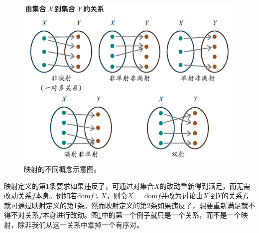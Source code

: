 \documentclass[../main.tex]{subfiles}
\begin{document}
\begin{figure}[htbp]
    \centering
    \includegraphics{../images/mapping.pdf}
    \caption{映射的不同概念示意图。}
    \label{fig:II.1.3}
\end{figure}

映射定义的第1条要求如果违反了，可通过对集合$X$的改动重新得到满足，而无需改动关系$f$本身。例如若$\mathrm{dom}f\subsetneqq X$，则令$X^\prime=\mathrm{dom}f$并改为讨论由$X^\prime$到$Y$的关系$f$，就可通过映射定义的第1条。然而映射定义的第2条如果违反了，想要重新满足就不得不对关系$f$本身进行改动。图\ref{fig:II.1.3}中的第一个例子就只是一个关系，而不是一个映射，除非我们从这一关系中拿掉一个有序对。
\end{document}
